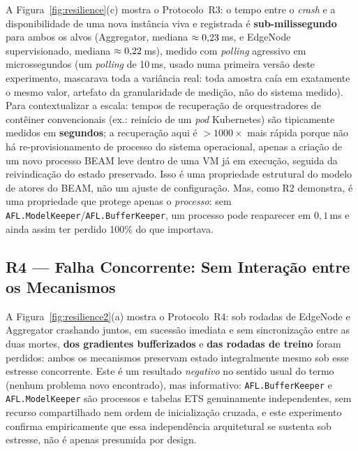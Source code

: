 \documentclass[conference,a4paper]{IEEEtran}
\begin{document}
A Figura~\ref{fig:resilience}(c) mostra o Protocolo~R3: o tempo entre o
\textit{crash} e a disponibilidade de uma nova instância viva e registrada
é \textbf{sub-milissegundo} para ambos os alvos (Aggregator, mediana
$\approx0{,}23$\,ms, e EdgeNode supervisionado, mediana
$\approx0{,}22$\,ms), medido com \textit{polling} agressivo em
microssegundos (um \textit{polling} de 10\,ms, usado numa primeira versão
deste experimento, mascarava toda a variância real: toda amostra caía em
exatamente o mesmo valor, artefato da granularidade de medição, não do
sistema medido). Para contextualizar a escala: tempos de recuperação de
orquestradores de contêiner convencionais (ex.: reinício de um
\textit{pod} Kubernetes) são tipicamente medidos em \textbf{segundos}; a
recuperação aqui é $>1000\times$ mais rápida porque não há
re-provisionamento de processo do sistema operacional, apenas a criação
de um novo processo BEAM leve dentro de uma VM já em execução, seguida da
reivindicação do estado preservado. Isso é uma propriedade estrutural do
modelo de atores do BEAM, não um ajuste de configuração. Mas, como R2
demonstra, é uma propriedade que protege apenas o \emph{processo}: sem
\texttt{AFL.ModelKeeper}/\texttt{AFL.BufferKeeper}, um processo pode
reaparecer em $0{,}1$\,ms e ainda assim ter perdido 100\% do que importava.

\subsection{R4 --- Falha Concorrente: Sem Interação entre os Mecanismos}
\label{sec:r4}

A Figura~\ref{fig:resilience2}(a) mostra o Protocolo~R4: sob
\statExpRFourTrials{} rodadas de EdgeNode e Aggregator crashando juntos,
em sucessão imediata e sem sincronização entre as duas mortes,
\textbf{\statExpRFourBufferLost{} dos \statExpRFourBufferWritten{}
gradientes bufferizados} e \textbf{\statExpRFourRoundsLost{} das
\statExpRFourRoundsTrained{} rodadas de treino} foram perdidos: ambos
os mecanismos preservam estado integralmente mesmo sob esse estresse
concorrente. Este é um resultado \emph{negativo} no sentido usual do termo
(nenhum problema novo encontrado), mas informativo: \texttt{AFL.BufferKeeper}
e \texttt{AFL.ModelKeeper} são processos e tabelas ETS genuinamente
independentes, sem recurso compartilhado nem ordem de inicialização
cruzada, e este experimento confirma empiricamente que essa independência
arquitetural se sustenta sob estresse, não é apenas presumida por design.
\end{document}
